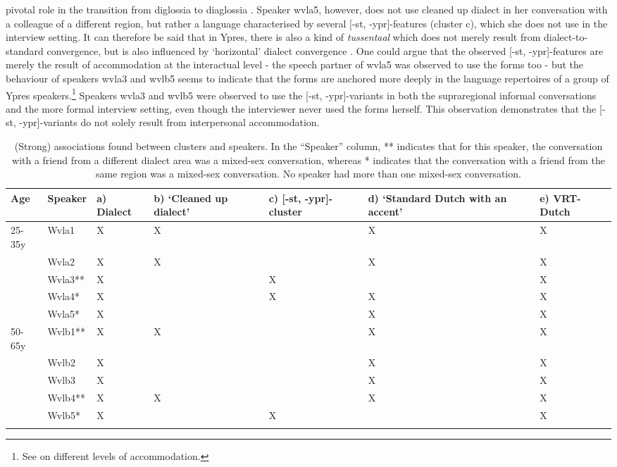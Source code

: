 \documentclass[output=paper]{LSP/langsci}
\begin{document}
pivotal role in the transition from diglossia to diaglossia \citep{auer_convergence_1996}. Speaker wvla5, however, does not use cleaned up dialect in her conversation with a colleague of a different region, but rather a language characterised by several [-st, -ypr]-features (cluster c), which she does not use in the interview setting. It can therefore be said that in Ypres, there is also a kind of \textit{tussentaal} which does not merely result from dialect-to-standard convergence, but is also influenced by ‘horizontal’ dialect convergence \citep{auer_convergence_1996}. One could argue that the observed [-st, -ypr]-features are merely the result of accommodation at the interactual level - the speech partner of wvla5 was observed to use the forms too - but the behaviour of speakers wvla3 and wvlb5 seems to indicate that the forms are anchored more deeply in the language repertoires of a group of Ypres speakers.\footnote{See \citet{auer_convergence_1996} on different levels of accommodation.} Speakers wvla3 and wvlb5 were observed to use the [-st, -ypr]-variants in both the supraregional informal conversations and the more formal interview setting, even though the interviewer never used the forms herself. This observation demonstrates that the [-st, -ypr]-variants do not solely result from interpersonal accommodation. 

\begin{table}
\begin{tabularx}{\textwidth}{XXXXXXX}
\lsptoprule
{Age} & Speaker & a) Dialect & b) `Cleaned up dialect' & c) [-st, -ypr]-cluster & d) `Standard Dutch with an accent' & e) VRT-Dutch\\
\midrule
{25-35y} & Wvla1 & X & X &  & X & X\\
& Wvla2 & X & X &  & X & X\\
\hhline{~------} & Wvla3** & X &  & X &  & X\\
\hhline{~------} & Wvla4* & X &  & X & X & X\\
\hhline{~------} & Wvla5* & X &  &  & X & X\\
{50-65y} & Wvlb1** & X & X &  & X & X\\
& Wvlb2 & X &  &  & X & X\\
\hhline{~------} & Wvlb3 & X &  &  & X & X\\
\hhline{~------} & Wvlb4** & X & X &  & X & X\\
\hhline{~------} & Wvlb5* & X &  & X &  & X\\
\hhline{~------}
\lspbottomrule
\end{tabularx}
\caption{(Strong) associations found between clusters and speakers. In the ``Speaker'' column, ** indicates that for this speaker, the conversation with a friend from a different dialect area was a mixed-sex conversation, whereas * indicates that the conversation with a friend from the same region was a mixed-sex conversation. No speaker had more than one mixed-sex conversation.}
\label{tab:2}
\end{table}
\end{document}
